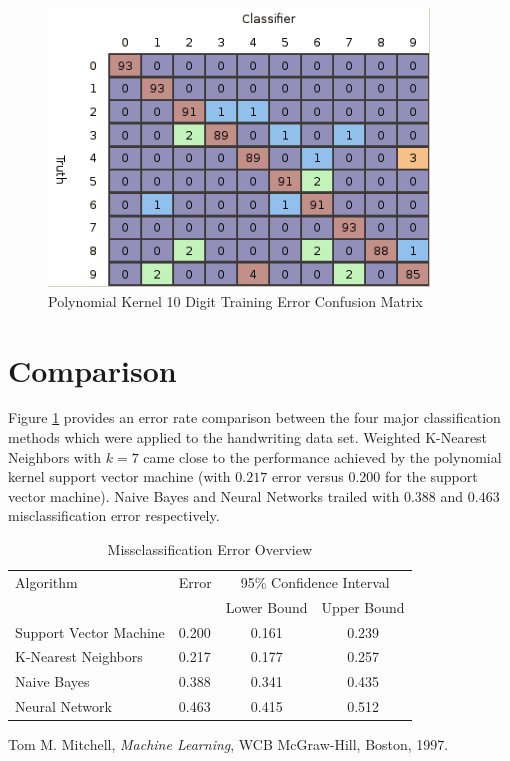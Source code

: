 \documentclass{article}
\begin{document}
\begin{figure}
\centering
\includegraphics[width=0.9\textwidth]{images/poly_all_confusion_training.png}
\caption{Polynomial Kernel 10 Digit Training Error Confusion Matrix}
\label{poly10trainconfusion}
\end{figure}

\section{Comparison}\label{Comparison}

Figure \ref{error3} provides an error rate comparison between the four major classification methods which were applied to the handwriting data set. Weighted K-Nearest Neighbors with \(k=7\) came close to the performance achieved by the polynomial kernel support vector machine (with \(0.217\) error versus \(0.200\) for the support vector machine). Naive Bayes and Neural Networks trailed with \(0.388\) and \(0.463\) misclassification error respectively.

\begin{table}
\caption{Missclassification Error Overview}
\begin{center}
\begin{tabular}{llcc}
\toprule
Algorithm & Error & \multicolumn{2}{c}{95\% Confidence Interval} \\
\cmidrule(r){3-4}
& & Lower Bound & Upper Bound \\
\midrule
Support Vector Machine & 0.200 & 0.161 & 0.239 \\
K-Nearest Neighbors & 0.217 & 0.177 & 0.257 \\
Naive Bayes & 0.388 &  0.341 & 0.435  \\
Neural Network & 0.463 &  0.415 & 0.512  \\
\bottomrule
\end{tabular}
\label{error3}
\end{center}
\end{table}

\begin{thebibliography}{9}

  Tom M. Mitchell,
  \emph{Machine Learning},
  WCB McGraw-Hill, Boston,
  1997.

\end{thebibliography}
\end{document}
